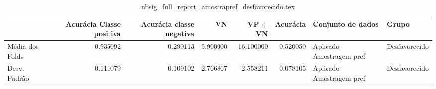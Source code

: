 \begin{table}
\centering
\caption{nbsig_full_report_amostrapref_desfavorecido.tex}
\label{nbsig_full_report_amostrapref_desfavorecido.tex}
\begin{tabular}{lrrrrrll}
\toprule
{} &  Acurácia Classe positiva &  Acurácia classe negativa &       VN  &   VP + VN  &  Acurácia &         Conjunto de dados &          Grupo \\
\midrule
Média dos Folds &                  0.935092 &                  0.290113 &  5.900000 &  16.100000 &  0.520050 &  Aplicado Amostragem pref &  Desfavorecido \\
Desv. Padrão    &                  0.111079 &                  0.109102 &  2.766867 &   2.558211 &  0.078105 &  Aplicado Amostragem pref &  Desfavorecido \\
\bottomrule
\end{tabular}
\end{table}
